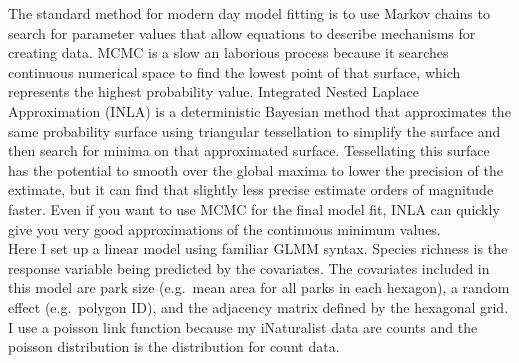 \documentclass[
]{article}
\begin{document}
The standard method for modern day model fitting is to use Markov chains
to search for parameter values that allow equations to describe
mechanisms for creating data. MCMC is a slow an laborious process
because it searches continuous numerical space to find the lowest point
of that surface, which represents the highest probability value.
Integrated Nested Laplace Approximation (INLA) is a deterministic
Bayesian method that approximates the same probability surface using
triangular tessellation to simplify the surface and then search for
minima on that approximated surface. Tessellating this surface has the
potential to smooth over the global maxima to lower the precision of the
extimate, but it can find that slightly less precise estimate orders of
magnitude faster. Even if you want to use MCMC for the final model fit,
INLA can quickly give you very good approximations of the continuous
minimum values.\\
Here I set up a linear model using familiar GLMM syntax. Species
richness is the response variable being predicted by the covariates. The
covariates included in this model are park size (e.g.~mean area for all
parks in each hexagon), a random effect (e.g.~polygon ID), and the
adjacency matrix defined by the hexagonal grid. I use a poisson link
function because my iNaturalist data are counts and the poisson
distribution is the distribution for count data.
\end{document}
